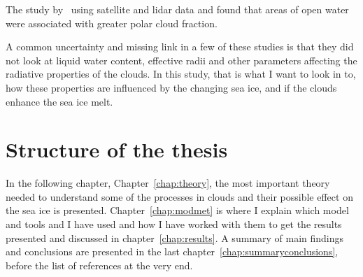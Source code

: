 The study by~\citet{Palm2010} using satellite and lidar data and found that areas of open water were associated with greater polar cloud fraction. %


A common uncertainty and missing link in a few of these studies is that they did not look at liquid water content, effective radii and other parameters affecting the radiative properties of the clouds. In this study, that is what I want to look in to, how these properties are influenced by the changing sea ice, and if the clouds enhance the sea ice melt.






\section{Structure of the thesis}
In the following chapter, Chapter~\ref{chap:theory}, the most important theory needed to understand some of the processes in clouds and their possible effect on the sea ice is presented. Chapter~\ref{chap:modmet} is where I explain which model and tools and I have used and how I have worked with them to get the results presented and discussed in chapter~\ref{chap:results}. A summary of main findings and conclusions are presented in the last chapter~\ref{chap:summaryconclusions}, before the list of references at the very end.